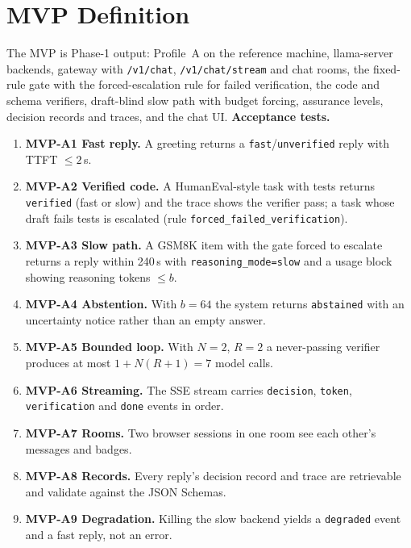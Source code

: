 \documentclass[11pt,a4paper]{article}
\begin{document}
\section{MVP Definition}
\label{sec:mvp}
The MVP is Phase-1 output: Profile~A on the reference machine, llama-server backends, gateway with \texttt{/v1/chat}, \texttt{/v1/chat/stream} and chat rooms, the fixed-rule gate with the forced-escalation rule for failed verification, the code and schema verifiers, draft-blind slow path with budget forcing, assurance levels, decision records and traces, and the chat UI. \textbf{Acceptance tests.}
\begin{enumerate}
\item \textbf{MVP-A1 Fast reply.} A greeting returns a \texttt{fast}/\texttt{unverified} reply with TTFT $\le2$\,s.
\item \textbf{MVP-A2 Verified code.} A HumanEval-style task with tests returns \texttt{verified} (fast or slow) and the trace shows the verifier pass; a task whose draft fails tests is escalated (rule \texttt{forced\_failed\_verification}).
\item \textbf{MVP-A3 Slow path.} A GSM8K item with the gate forced to escalate returns a reply within 240\,s with \texttt{reasoning\_mode=slow} and a usage block showing reasoning tokens $\le b$.
\item \textbf{MVP-A4 Abstention.} With $b=64$ the system returns \texttt{abstained} with an uncertainty notice rather than an empty answer.
\item \textbf{MVP-A5 Bounded loop.} With $N=2$, $R=2$ a never-passing verifier produces at most $1+N(R+1)=7$ model calls.
\item \textbf{MVP-A6 Streaming.} The SSE stream carries \texttt{decision}, \texttt{token}, \texttt{verification} and \texttt{done} events in order.
\item \textbf{MVP-A7 Rooms.} Two browser sessions in one room see each other's messages and badges.
\item \textbf{MVP-A8 Records.} Every reply's decision record and trace are retrievable and validate against the JSON Schemas.
\item \textbf{MVP-A9 Degradation.} Killing the slow backend yields a \texttt{degraded} event and a fast reply, not an error.
\end{enumerate}
\end{document}

